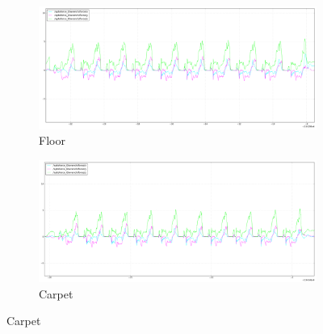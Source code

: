 \documentclass[USenglish]{ifimaster}  %
\begin{document}
\begin{figure} [h]
	\centering
	\begin{subfigure}[b]{\textwidth}
		\includegraphics[width=\textwidth,height=\textheight,keepaspectratio]{Figures/gulvgraf}
		\caption{Floor}
		\label{fig:gulvgraf} 
	\end{subfigure}
	
	\begin{subfigure}[b]{\textwidth}
		\includegraphics[width=\textwidth,height=\textheight,keepaspectratio]{Figures/teppegraf}
		\caption{Carpet}
		\label{fig:teppegraf}
	\end{subfigure}
	\end{figure}
\end{document}
